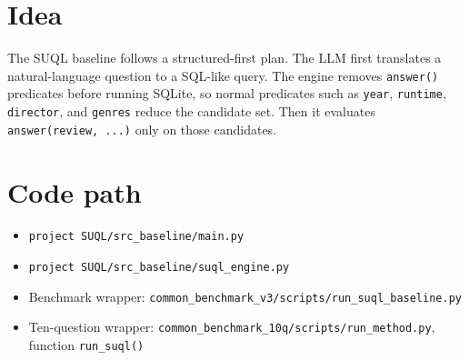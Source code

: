 \documentclass[11pt,oneside]{book}
\begin{document}
\section{Idea}
The SUQL baseline follows a structured-first plan. The LLM first translates a natural-language question to a SQL-like query. The engine removes \texttt{answer()} predicates before running SQLite, so normal predicates such as \texttt{year}, \texttt{runtime}, \texttt{director}, and \texttt{genres} reduce the candidate set. Then it evaluates \texttt{answer(review, ...)} only on those candidates.
\section{Code path}
\begin{itemize}
\item \texttt{project SUQL/src\_baseline/main.py}
\item \texttt{project SUQL/src\_baseline/suql\_engine.py}
\item Benchmark wrapper: \texttt{common\_benchmark\_v3/scripts/run\_suql\_baseline.py}
\item Ten-question wrapper: \texttt{common\_benchmark\_10q/scripts/run\_method.py}, function
\texttt{run\_suql()}
\end{itemize}
\end{document}
